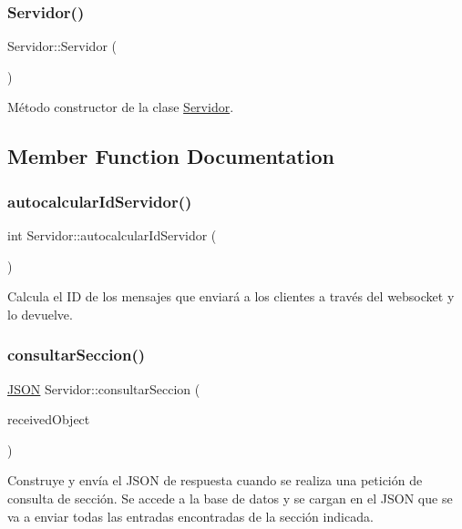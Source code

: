 \subsubsection{\texorpdfstring{Servidor()}{Servidor()}}
{\footnotesize\ttfamily Servidor\+::\+Servidor (\begin{DoxyParamCaption}{ }\end{DoxyParamCaption})}

Método constructor de la clase \mbox{\hyperlink{classServidor}{Servidor}}. 

\subsection{Member Function Documentation}
\mbox{\label{classServidor_a292f87f595ed2afd654abe3cc5ba8dc0}} 
\subsubsection{\texorpdfstring{autocalcular\+Id\+Servidor()}{autocalcularIdServidor()}}
{\footnotesize\ttfamily int Servidor\+::autocalcular\+Id\+Servidor (\begin{DoxyParamCaption}{ }\end{DoxyParamCaption})}

Calcula el ID de los mensajes que enviará a los clientes a través del websocket y lo devuelve. \mbox{\label{classServidor_a172605658340719264d589037d2417d8}} 
\subsubsection{\texorpdfstring{consultar\+Seccion()}{consultarSeccion()}}
{\footnotesize\ttfamily \mbox{\hyperlink{classnlohmann_1_1basic__json}{J\+S\+ON}} Servidor\+::consultar\+Seccion (\begin{DoxyParamCaption}\item[{\mbox{\hyperlink{classnlohmann_1_1basic__json}{J\+S\+ON}}}]{received\+Object }\end{DoxyParamCaption})}

Construye y envía el J\+S\+ON de respuesta cuando se realiza una petición de consulta de sección. Se accede a la base de datos y se cargan en el J\+S\+ON que se va a enviar todas las entradas encontradas de la sección indicada. \mbox{\label{classServidor_a211b7b43cd2b5d81b1f21413bce9fbf2}} 
